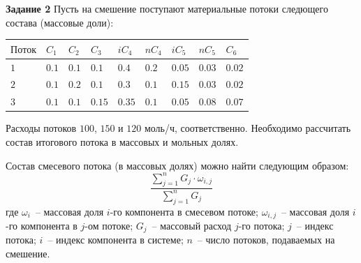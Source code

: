 \documentclass[aspectratio=169, mathserif]{beamer}%
\begin{document}
\begin{frame}[fragile]{\space}
\scriptsize
\begin{alertblock}{\textbf{Задание 2}}
Пусть на смешение поступают материальные потоки следющего состава (массовые доли):
\end{alertblock}
\vfill
\begin{table}[h!]
	\begin{tabular}{|p{.2\linewidth}|p{.05\linewidth}|p{.05\linewidth}|p{.05\linewidth}|p{.05\linewidth}|p{.05\linewidth}|p{.05\linewidth}|p{.05\linewidth}|p{.05\linewidth}|}
		\hline
		$\mathrm{Поток}$ & $C_1$ & $C_2$ & $C_3$ & $iC_4$ & $nC_4$ & $iC_5$ & $nC_5$ & $C_6$ \\
		\hline
		$1$ & $0.1$ & $0.1$ & $0.1$ & $0.4$ & $0.2$ & $0.05$ & $0.03$ & $0.02$ \\
		\hline
		$2$ & $0.1$ & $0.2$ & $0.1$ & $0.3$ & $0.1$ & $0.15$ & $0.03$ & $0.02$ \\
		\hline
		$3$ & $0.1$ & $0.1$ & $0.15$ & $0.35$ & $0.1$ & $0.05$ & $0.08$ & $0.07$ \\
		\hline
	\end{tabular}
\end{table}
\vfill
Расходы потоков $100$, $150$ и $120$ моль/ч, соответственно.
Необходимо рассчитать состав итогового потока в массовых и мольных долях.

Состав смесевого потока (в массовых долях) можно найти следующим образом:
$$
	\dfrac{\sum\limits_{j=1}^{n}G_j \cdot \omega_{i, j}}{\sum\limits_{j=1}^{n}G_j}
$$
\vfill
где $\omega_i$~-- массовая доля $i$-го компонента в смесевом потоке; $\omega_{i, j}$~-- массовая доля $i$-го компонента в $j$-ом потоке; $G_j$~-- массовый расход $j$-го потока; $j$~-- индекс потока; $i$~-- индекс компонента в системе; $n$~-- число потоков, подаваемых на смешение.
\vfill
\end{frame}

\end{document}
